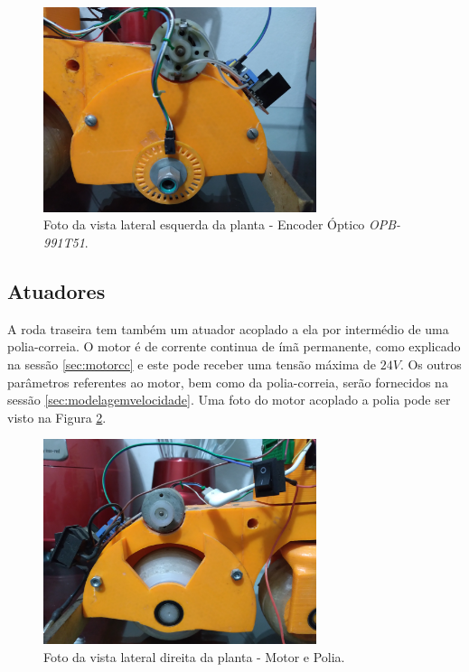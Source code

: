         	\begin{figure}[h]
                \centering
                \includegraphics[width=8cm]{Imagens/cap2/foto-encoder.jpg}
                \caption{Foto da vista lateral esquerda da planta - Encoder Óptico \textit{OPB-991T51}.}
                \label{img:encoder}
            \end{figure}
        
        \subsection{Atuadores}
        
    	    A roda traseira tem também um atuador acoplado a ela por intermédio de uma polia-correia. O motor é de corrente continua de ímã permanente, como explicado na sessão \ref{sec:motorcc} e este pode receber uma tensão máxima de $24V$. Os outros parâmetros referentes ao motor, bem como da polia-correia, serão fornecidos na sessão \ref{sec:modelagemvelocidade}. Uma foto do motor acoplado a polia pode ser visto na Figura \ref{img:motor-polia}.
    	
        	\begin{figure}[h]
                \centering
                \includegraphics[width=8cm]{Imagens/cap2/foto-motor-polia.jpg}
                \caption{Foto da vista lateral direita da planta - Motor e Polia.}
                \label{img:motor-polia}
            \end{figure}
    	    
